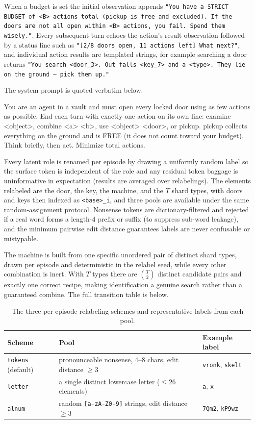 \documentclass{article}
\begin{document}
When a budget is set the initial observation appends \texttt{"You have a STRICT BUDGET of <B> actions total (pickup is free and excluded). If the doors are not all open within <B> actions, you fail. Spend them wisely."}. Every subsequent turn echoes the action's result observation followed by a status line such as \texttt{"[2/8 doors open, 11 actions left] What next?"}, and individual action results are templated strings, for example searching a door returns \texttt{"You search <door\_3>. Out falls <key\_7> and a <type>. They lie on the ground -- pick them up."}

The system prompt is quoted verbatim below.

\begin{spverbatim}
You are an agent in a vault and must open every locked door using as few actions as possible. End each turn with exactly one action on its own line: examine <object>, combine <a> <b>, use <object> <door>, or pickup. pickup collects everything on the ground and is FREE (it does not count toward your budget). Think briefly, then act. Minimize total actions.
\end{spverbatim}

Every latent role is renamed per episode by drawing a uniformly random label so the surface token is independent of the role and any residual token baggage is uninformative in expectation (results are averaged over relabelings). The elements relabeled are the door, the key, the machine, and the $T$ shard types, with doors and keys then indexed as \texttt{<base>\_i}, and three pools are available under the same random-assignment protocol. Nonsense tokens are dictionary-filtered and rejected if a real word forms a length-4 prefix or suffix (to suppress sub-word leakage), and the minimum pairwise edit distance guarantees labels are never confusable or mistypable.

The machine is built from one specific unordered pair of distinct shard types, drawn per episode and deterministic in the relabel seed, while every other combination is inert. With $T$ types there are $\binom{T}{2}$ distinct candidate pairs and exactly one correct recipe, making identification a genuine search rather than a guaranteed combine. The full transition table is below.

\begin{table}[h]
\centering
\begin{tabular}{@{}lll@{}}
\toprule
Scheme & Pool & Example label \\
\midrule
\texttt{tokens} (default) & pronounceable nonsense, 4--8 chars, edit distance $\geq 3$ & \texttt{vronk}, \texttt{skelt} \\
\texttt{letter}           & a single distinct lowercase letter ($\leq 26$ elements)     & \texttt{a}, \texttt{x} \\
\texttt{alnum}            & random \texttt{[a-zA-Z0-9]} strings, edit distance $\geq 3$ & \texttt{7Qm2}, \texttt{kP9wz} \\
\bottomrule
\end{tabular}
\caption{The three per-episode relabeling schemes and representative labels from each pool.}
\label{tab:obf-schemes}
\end{table}
\end{document}
